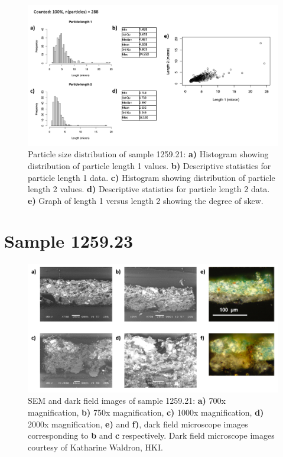\begin{figure}[H]
\centering
  \includegraphics[width=0.8\linewidth]{1259.21_partsize}
\caption[Particle size distribution, sample 1259.21.]{Particle size distribution of sample 1259.21: \textbf{a)} Histogram showing distribution of particle length 1 values. \textbf{b)} Descriptive statistics for particle length 1 data. \textbf{c)} Histogram showing distribution of particle length 2 values. \textbf{d)} Descriptive statistics for particle length 2 data. \textbf{e)} Graph of length 1 versus length 2 showing the degree of skew.}
\label{fig:1259.21_partsize}
\end{figure}


\section{Sample 1259.23}


\begin{figure}[H]
  \centering
  \includegraphics[width=0.8\linewidth]{1259.23_imgs}
\caption[SEM and dark field images of sample 1259.21.]{SEM and dark field images of sample 1259.21: \textbf{a)} 700x magnification, \textbf{b)} 750x magnification, \textbf{c)} 1000x magnification, \textbf{d)} 2000x magnification, \textbf{e)} and \textbf{f)}, dark field microscope images corresponding to \textbf{b} and \textbf{c} respectively. Dark field microscope images courtesy of Katharine Waldron, HKI.}
\label{fig:1259.23_imgs}
\end{figure}

